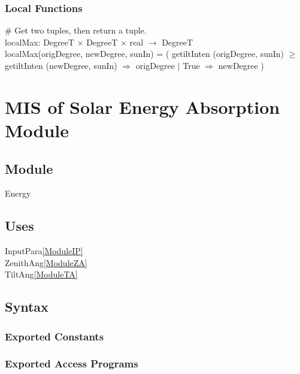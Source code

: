 \documentclass[12pt, titlepage]{article}
\begin{document}

\subsubsection{Local Functions}

$\#$ Get two tuples, then return a tuple.\\
localMax: DegreeT $\times$ DegreeT $\times$ real $\rightarrow$ DegreeT\\
localMax(origDegree, newDegree, sunIn) = ( getiltInten (origDegree, sunIn) $\geq$ getiltInten (newDegree, sunIn) $\Rightarrow$ origDegree $|$ True $\Rightarrow$ newDegree )\\


 



\section{MIS of Solar Energy Absorption Module} \label{ModuleE} 

\subsection{Module}
Energy

\subsection{Uses}
InputPara\ref{ModuleIP}\\
ZenithAng\ref{ModuleZA}\\ 
TiltAng\ref{ModuleTA}

\subsection{Syntax}

\subsubsection{Exported Constants}


\subsubsection{Exported Access Programs}
\end{document}
